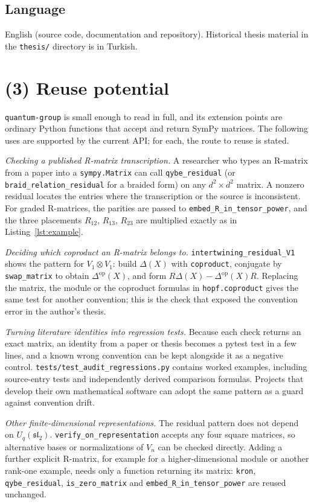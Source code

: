\documentclass[11pt,a4paper]{article}
\newcommand{\pkg}{\texttt{quantum-group}}
\newcommand{\code}[1]{\texttt{#1}}
\newcommand{\Uq}{U_q(\mathfrak{sl}_2)}
\begin{document}
\subsection*{Language}

English (source code, documentation and repository). Historical thesis material in the \code{thesis/} directory is in Turkish.

\section*{(3) Reuse potential}

\pkg{} is small enough to read in full, and its extension points are ordinary Python functions that accept and return SymPy matrices. The following uses are supported by the current API; for each, the route to reuse is stated.

\emph{Checking a published R-matrix transcription.} A researcher who types an R-matrix from a paper into a \code{sympy.Matrix} can call \code{qybe\_residual} (or \code{braid\_relation\_residual} for a braided form) on any $d^2\times d^2$ matrix. A nonzero residual locates the entries where the transcription or the source is inconsistent. For graded R-matrices, the parities are passed to \code{embed\_R\_in\_tensor\_power}, and the three placements $R_{12}$, $R_{13}$, $R_{23}$ are multiplied exactly as in Listing~\ref{lst:example}.

\emph{Deciding which coproduct an R-matrix belongs to.} \code{intertwining\_residual\_V1} shows the pattern for $V_1\otimes V_1$: build $\Delta(X)$ with \code{coproduct}, conjugate by \code{swap\_matrix} to obtain $\Delta^{\mathrm{op}}(X)$, and form $R\Delta(X)-\Delta^{\mathrm{op}}(X)R$. Replacing the matrix, the module or the coproduct formulas in \code{hopf.coproduct} gives the same test for another convention; this is the check that exposed the convention error in the author's thesis.

\emph{Turning literature identities into regression tests.} Because each check returns an exact matrix, an identity from a paper or thesis becomes a pytest test in a few lines, and a known wrong convention can be kept alongside it as a negative control. \code{tests/test\_audit\_regressions.py} contains worked examples, including source-entry tests and independently derived comparison formulas. Projects that develop their own mathematical software can adopt the same pattern as a guard against convention drift.

\emph{Other finite-dimensional representations.} The residual pattern does not depend on $\Uq$. \code{verify\_on\_representation} accepts any four square matrices, so alternative bases or normalizations of $V_n$ can be checked directly. Adding a further explicit R-matrix, for example for a higher-dimensional module or another rank-one example, needs only a function returning its matrix: \code{kron}, \code{qybe\_residual}, \code{is\_zero\_matrix} and \code{embed\_R\_in\_tensor\_power} are reused unchanged.
\end{document}
